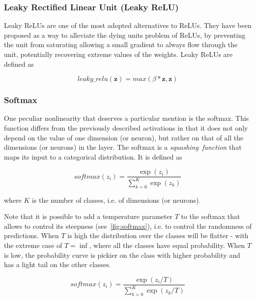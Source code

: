 \subsubsection{Leaky Rectified Linear Unit (Leaky ReLU)}\label{sec:lrelu}
Leaky ReLUs are one of the most adopted alternatives to ReLUs. They have been
proposed as a way to alleviate the dying units problem of ReLUs, by preventing
the unit from saturating allowing a small gradient to always flow through the
unit, potentially recovering extreme values of the weights. Leaky ReLUs are
defined as

\begin{equation}\label{eq:lrelu}
    leaky\_relu(\mathbf{z}) = max(\beta*\mathbf{z}, \mathbf{z})
\end{equation}

\subsubsection{Softmax}\label{sec:softmax}
One peculiar nonlinearity that deserves a particular mention is the softmax.
This function differs from the previously described activations in that it
does not only depend on the value of one dimension (or neuron), but rather on
that of all the dimensions (or neurons) in the layer. The softmax is a
\emph{squashing~function} that maps its input to a categorical distribution.
It is defined as

\begin{equation}\label{eq:softmax}
    softmax(z_i) = \frac{\exp(z_i)}{\sum_{k=0}^K{\exp(z_k)}}
\end{equation}

\noindent where $K$ is the number of classes, i.e. of dimensions (or neurons).

Note that it is possible to add a temperature parameter $T$ to the softmax that
allows to control its steepness (see~\autoref{fig:softmax}), i.e. to control
the randomness of predictions. When $T$ is high the distribution over the
classes will be flatter - with the extreme case of $T = \inf$, where all the
classes have equal probability. When $T$ is low, the probability curve is
pickier on the class with higher probability and has a light tail on the other
classes.

\begin{equation}\label{eq:softmax_tmp}
    softmax(z_i) = \frac{\exp(z_i / T)}
                        {\sum_{k=0}^K{\exp(z_k / T)}}
\end{equation}

